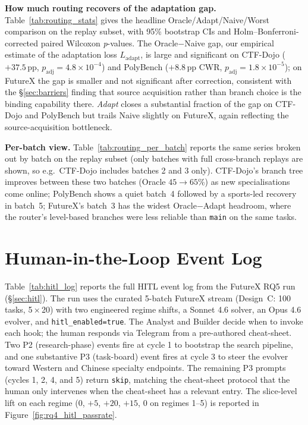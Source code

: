 

\noindent\textbf{How much routing recovers of the adaptation gap.}
Table~\ref{tab:routing_stats} gives the headline Oracle/Adapt/Naive/Worst comparison on the replay subset, with 95\% bootstrap CIs and Holm--Bonferroni-corrected paired Wilcoxon \emph{p}-values. The Oracle$-$Naive gap, our empirical estimate of the adaptation loss $L_\mathrm{adapt}$, is large and significant on CTF-Dojo ($+37.5$\,pp, $p_\mathrm{adj}\!=\!4.8\times10^{-4}$) and PolyBench ($+8.8$\,pp CWR, $p_\mathrm{adj}\!=\!1.8\times10^{-5}$); on FutureX the gap is smaller and not significant after correction, consistent with the \S\ref{sec:barriers} finding that source acquisition rather than branch choice is the binding capability there. \emph{Adapt} closes a substantial fraction of the gap on CTF-Dojo and PolyBench but trails Naive slightly on FutureX, again reflecting the source-acquisition bottleneck.



\noindent\textbf{Per-batch view.}
Table~\ref{tab:routing_per_batch} reports the same series broken out by batch on the replay subset (only batches with full cross-branch replays are shown, so e.g.\ CTF-Dojo includes batches 2 and 3 only). CTF-Dojo's branch tree improves between these two batches (Oracle $45\!\to\!65$\%) as new specialisations come online; PolyBench shows a quiet batch~4 followed by a sports-led recovery in batch~5; FutureX's batch~3 has the widest Oracle$-$Adapt headroom, where the router's level-based branches were less reliable than \texttt{main} on the same tasks.



\section{Human-in-the-Loop Event Log}
\label{app:hitl_log}

Table~\ref{tab:hitl_log} reports the full HITL event log from the FutureX RQ5 run (\S\ref{sec:hitl}). The run uses the curated 5-batch FutureX stream (Design~C: 100 tasks, 5\,$\times$\,20) with two engineered regime shifts, a Sonnet 4.6 solver, an Opus 4.6 evolver, and \texttt{hitl\_enabled=true}. The Analyst and Builder decide when to invoke each hook; the human responds via Telegram from a pre-authored cheat-sheet. Two P2 (research-phase) events fire at cycle 1 to bootstrap the search pipeline, and one substantive P3 (task-board) event fires at cycle 3 to steer the evolver toward Western and Chinese specialty endpoints. The remaining P3 prompts (cycles 1, 2, 4, and 5) return \texttt{skip}, matching the cheat-sheet protocol that the human only intervenes when the cheat-sheet has a relevant entry. The slice-level lift on each regime ($0$, $+5$, $+20$, $+15$, $0$ on regimes 1–5) is reported in Figure~\ref{fig:rq4_hitl_passrate}.

